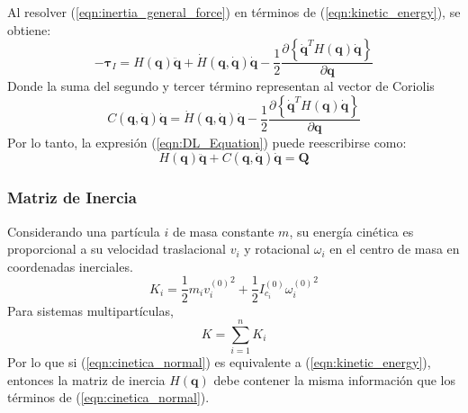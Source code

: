     Al resolver (\ref{eqn:inertia_general_force}) en términos de (\ref{eqn:kinetic_energy}), se obtiene:
    \begin{equation}
        \label{eqn:inertial_terms}
        -\boldsymbol{\tau}_I = H(\boldsymbol{q}) \boldsymbol{\ddot{q}} + \dot{H}(\boldsymbol{q}, \boldsymbol{{\dot{q}}}) \boldsymbol{{\dot{q}}}
        - \frac{1}{2} \frac{\partial \left \{ \boldsymbol{\dot{q}}^T H(\boldsymbol{q}) \boldsymbol{\dot{q}} \right \} }{\partial \boldsymbol{q}}
    \end{equation}
    Donde la suma del segundo y tercer término representan al vector de Coriolis
    \begin{equation}
        \label{eqn:coriolis_term}
        C(\boldsymbol{q}, \boldsymbol{\dot{q}}) \boldsymbol{\dot{q}} = \dot{H}(\boldsymbol{q}, \boldsymbol{{\dot{q}}}) \boldsymbol{{\dot{q}}}
        - \frac{1}{2} \frac{\partial \left \{ \boldsymbol{\dot{q}}^T H(\boldsymbol{q}) \boldsymbol{\dot{q}} \right \} }{\partial \boldsymbol{q}}
    \end{equation} 
    Por lo tanto, la expresión (\ref{eqn:DL_Equation}) puede reescribirse como:
    \begin{equation}
        \label{eqn:DL_vectors}
        H(\boldsymbol{q}) \boldsymbol{\ddot{q}} + C(\boldsymbol{q}, \boldsymbol{\dot{q}}) \boldsymbol{\dot{q}} = \boldsymbol{Q}
    \end{equation}
    
    \subsubsection{Matriz de Inercia}
    Considerando una partícula $i$ de masa constante $m$, su energía cinética es proporcional a su velocidad traslacional $v_i$ 
    y rotacional $\omega_i$ en el centro de masa en coordenadas inerciales.
    \begin{equation}
        \label{eqn:cinetica_normal}
         K_i = \frac{1}{2} m_i {v_i^{(0)}}^2 + \frac{1}{2} I_{c_i}^{(0)} {\omega_i^{(0)}}^2 
    \end{equation}
    Para sistemas multipartículas, 
    \begin{equation}
        \label{eqn:cinetica_multi}
         K = \sum_{i=1}^n K_i
    \end{equation}
    Por lo que si (\ref{eqn:cinetica_normal}) es equivalente a (\ref{eqn:kinetic_energy}), entonces la matriz de inercia $H(\boldsymbol{q})$ debe 
    contener la misma información que los términos de (\ref{eqn:cinetica_normal}). 
    
